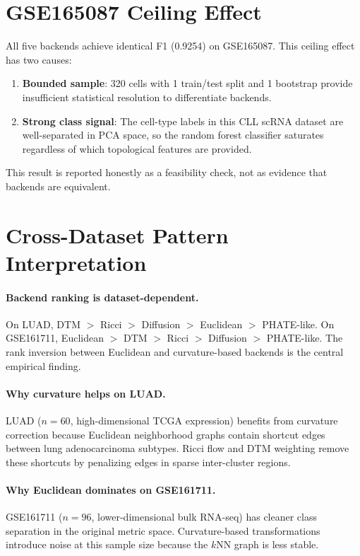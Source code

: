 \documentclass[11pt]{article}
\begin{document}
\section{GSE165087 Ceiling Effect}
\label{sec:ceiling}

All five backends achieve identical F1 (0.9254) on GSE165087.
This ceiling effect has two causes:
\begin{enumerate}[leftmargin=1.5em]
\item \textbf{Bounded sample}: 320 cells with 1 train/test split and 1 bootstrap provide insufficient statistical resolution to differentiate backends.
\item \textbf{Strong class signal}: The cell-type labels in this CLL scRNA dataset are well-separated in PCA space, so the random forest classifier saturates regardless of which topological features are provided.
\end{enumerate}
This result is reported honestly as a feasibility check, not as evidence that backends are equivalent.

\section{Cross-Dataset Pattern Interpretation}
\label{sec:patterns}

\paragraph{Backend ranking is dataset-dependent.}
On LUAD, DTM $>$ Ricci $>$ Diffusion $>$ Euclidean $>$ PHATE-like.
On GSE161711, Euclidean $>$ DTM $>$ Ricci $>$ Diffusion $>$ PHATE-like.
The rank inversion between Euclidean and curvature-based backends is the central empirical finding.

\paragraph{Why curvature helps on LUAD.}
LUAD ($n=60$, high-dimensional TCGA expression) benefits from curvature correction because Euclidean neighborhood graphs contain shortcut edges between lung adenocarcinoma subtypes.
Ricci flow and DTM weighting remove these shortcuts by penalizing edges in sparse inter-cluster regions.

\paragraph{Why Euclidean dominates on GSE161711.}
GSE161711 ($n=96$, lower-dimensional bulk RNA-seq) has cleaner class separation in the original metric space.
Curvature-based transformations introduce noise at this sample size because the $k$NN graph is less stable.
\end{document}
